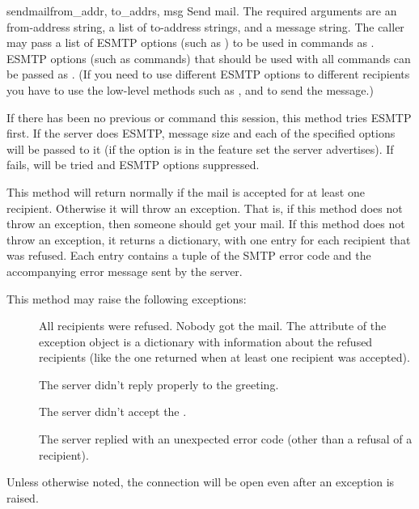 \begin{methoddesc}{sendmail}{from_addr, to_addrs, msg}
Send mail.  The required arguments are an  from-address
string, a list of  to-address strings, and a message string.
The caller may pass a list of ESMTP options (such as )
to be used in  commands as .  ESMTP
options (such as  commands) that should be used with all
 commands can be passed as .  (If you
need to use different ESMTP options to different recipients you have
to use the low-level methods such as ,  and
 to send the message.)


If there has been no previous  or  command this
session, this method tries ESMTP  first. If the server does
ESMTP, message size and each of the specified options will be passed
to it (if the option is in the feature set the server advertises).  If
 fails,  will be tried and ESMTP options
suppressed.

This method will return normally if the mail is accepted for at least
one recipient. Otherwise it will throw an exception.  That is, if this
method does not throw an exception, then someone should get your mail.
If this method does not throw an exception, it returns a dictionary,
with one entry for each recipient that was refused.  Each entry
contains a tuple of the SMTP error code and the accompanying error
message sent by the server.

This method may raise the following exceptions:

\begin{description}
\item[]
All recipients were refused.  Nobody got the mail.  The
 attribute of the exception object is a dictionary
with information about the refused recipients (like the one returned
when at least one recipient was accepted).

\item[]
The server didn't reply properly to the  greeting.

\item[]
The server didn't accept the .

\item[]
The server replied with an unexpected error code (other than a refusal
of a recipient).
\end{description}

Unless otherwise noted, the connection will be open even after
an exception is raised.

\end{methoddesc}

